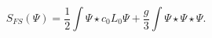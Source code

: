 \begin{equation}\label{eq:FSAction}
S_{FS}(\Psi) =   \frac{1}{2}\int \Psi \star c_0 L_0 \Psi 
+\frac{g}{3} \int \Psi \star \Psi \star \Psi.
\end{equation}


